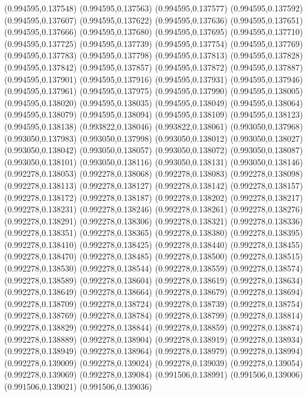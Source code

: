 (0.994595,0.137548)
(0.994595,0.137563)
(0.994595,0.137577)
(0.994595,0.137592)
(0.994595,0.137607)
(0.994595,0.137622)
(0.994595,0.137636)
(0.994595,0.137651)
(0.994595,0.137666)
(0.994595,0.137680)
(0.994595,0.137695)
(0.994595,0.137710)
(0.994595,0.137725)
(0.994595,0.137739)
(0.994595,0.137754)
(0.994595,0.137769)
(0.994595,0.137783)
(0.994595,0.137798)
(0.994595,0.137813)
(0.994595,0.137828)
(0.994595,0.137842)
(0.994595,0.137857)
(0.994595,0.137872)
(0.994595,0.137887)
(0.994595,0.137901)
(0.994595,0.137916)
(0.994595,0.137931)
(0.994595,0.137946)
(0.994595,0.137961)
(0.994595,0.137975)
(0.994595,0.137990)
(0.994595,0.138005)
(0.994595,0.138020)
(0.994595,0.138035)
(0.994595,0.138049)
(0.994595,0.138064)
(0.994595,0.138079)
(0.994595,0.138094)
(0.994595,0.138109)
(0.994595,0.138123)
(0.994595,0.138138)
(0.993822,0.138046)
(0.993822,0.138061)
(0.993050,0.137968)
(0.993050,0.137983)
(0.993050,0.137998)
(0.993050,0.138012)
(0.993050,0.138027)
(0.993050,0.138042)
(0.993050,0.138057)
(0.993050,0.138072)
(0.993050,0.138087)
(0.993050,0.138101)
(0.993050,0.138116)
(0.993050,0.138131)
(0.993050,0.138146)
(0.992278,0.138053)
(0.992278,0.138068)
(0.992278,0.138083)
(0.992278,0.138098)
(0.992278,0.138113)
(0.992278,0.138127)
(0.992278,0.138142)
(0.992278,0.138157)
(0.992278,0.138172)
(0.992278,0.138187)
(0.992278,0.138202)
(0.992278,0.138217)
(0.992278,0.138231)
(0.992278,0.138246)
(0.992278,0.138261)
(0.992278,0.138276)
(0.992278,0.138291)
(0.992278,0.138306)
(0.992278,0.138321)
(0.992278,0.138336)
(0.992278,0.138351)
(0.992278,0.138365)
(0.992278,0.138380)
(0.992278,0.138395)
(0.992278,0.138410)
(0.992278,0.138425)
(0.992278,0.138440)
(0.992278,0.138455)
(0.992278,0.138470)
(0.992278,0.138485)
(0.992278,0.138500)
(0.992278,0.138515)
(0.992278,0.138530)
(0.992278,0.138544)
(0.992278,0.138559)
(0.992278,0.138574)
(0.992278,0.138589)
(0.992278,0.138604)
(0.992278,0.138619)
(0.992278,0.138634)
(0.992278,0.138649)
(0.992278,0.138664)
(0.992278,0.138679)
(0.992278,0.138694)
(0.992278,0.138709)
(0.992278,0.138724)
(0.992278,0.138739)
(0.992278,0.138754)
(0.992278,0.138769)
(0.992278,0.138784)
(0.992278,0.138799)
(0.992278,0.138814)
(0.992278,0.138829)
(0.992278,0.138844)
(0.992278,0.138859)
(0.992278,0.138874)
(0.992278,0.138889)
(0.992278,0.138904)
(0.992278,0.138919)
(0.992278,0.138934)
(0.992278,0.138949)
(0.992278,0.138964)
(0.992278,0.138979)
(0.992278,0.138994)
(0.992278,0.139009)
(0.992278,0.139024)
(0.992278,0.139039)
(0.992278,0.139054)
(0.992278,0.139069)
(0.992278,0.139084)
(0.991506,0.138991)
(0.991506,0.139006)
(0.991506,0.139021)
(0.991506,0.139036)
